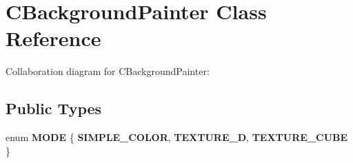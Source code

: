 \hypertarget{class_c_background_painter}{\section{C\+Background\+Painter Class Reference}
\label{class_c_background_painter}
}


Collaboration diagram for C\+Background\+Painter\+:
\subsection*{Public Types}
\begin{DoxyCompactItemize}
\item 
\hypertarget{class_c_background_painter_a823818367cda7dd0e619fc734010c7d8}{enum {\bfseries M\+O\+D\+E} \{ {\bfseries S\+I\+M\+P\+L\+E\+\_\+\+C\+O\+L\+O\+R}, 
{\bfseries T\+E\+X\+T\+U\+R\+E\+\_\+D}, 
{\bfseries T\+E\+X\+T\+U\+R\+E\+\_\+\+C\+U\+B\+E}
 \}}\label{class_c_background_painter_a823818367cda7dd0e619fc734010c7d8}

\end{DoxyCompactItemize}
